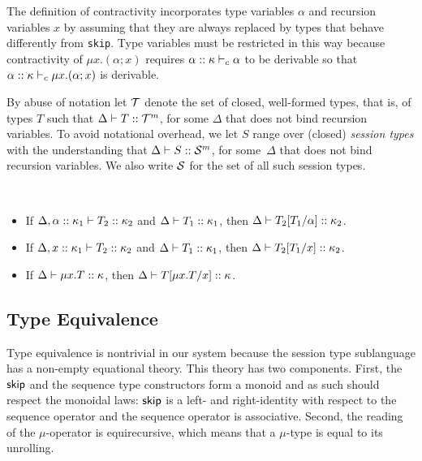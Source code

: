 The definition of contractivity incorporates type variables $\alpha$
and recursion variables $x$ by assuming that they are always replaced
by types that behave differently from  \lstinline|skip|.  Type
variables must be restricted in this way 
because contractivity of $\mu x. (\alpha; x)$ requires
$\alpha::\kappa \vdash_{c} \alpha$ %
to be derivable so that $\alpha::\kappa \vdash_{c} \mu x. (\alpha;
x)$ %
is derivable.

By abuse of notation let $\mathcal T$ denote the set of closed,
well-formed types, that is, of types $T$ such that
$\Delta \vdash T :: \mathcal T^m$, for some $\Delta$ that does not
bind recursion variables.
%
To avoid notational overhead, we let $S$ range over (closed) \emph{session
  types} with the understanding that $\Delta \vdash S :: \mathcal S^m$,
for some~$\Delta$ that does not bind recursion variables. We also
write $\mathcal S$ for the set of all such session types. 

\begin{lemma}\
  \label{lem:subs-preserves-kinding}
  \begin{itemize}
  \item If $\Delta,\alpha::\kappa_1 \vdash T_2 :: \kappa_2$ and
    $\Delta \vdash T_1 :: \kappa_1$, then
    $\Delta \vdash T_2[{T_1}/{\alpha}] :: \kappa_2$.
  \item If $\Delta,x::\kappa_1 \vdash T_2 :: \kappa_2$ and
    $\Delta \vdash T_1 :: \kappa_1$, then
    $\Delta \vdash T_2[{T_1}/{x}] :: \kappa_2$.
  \item If $\Delta \vdash \mu x.T :: \kappa$, then
    $\Delta \vdash T[{\mu x.T}/{x}] :: \kappa$.
  \end{itemize}
\end{lemma}
%


\subsection{Type Equivalence}
\label{sec:bisimulation}

Type equivalence is nontrivial in our system because the session type
sublanguage has a non-empty equational theory. This theory has two
components. First, the $\mathsf{skip}$ and the sequence type constructors
form a monoid and as such should respect the monoidal laws: $\mathsf{skip}$
is a left- and right-identity with respect to the sequence operator
and the sequence operator is associative. Second, the reading of the
$\mu$-operator is equirecursive, which means that a $\mu$-type is
equal to its unrolling. 

